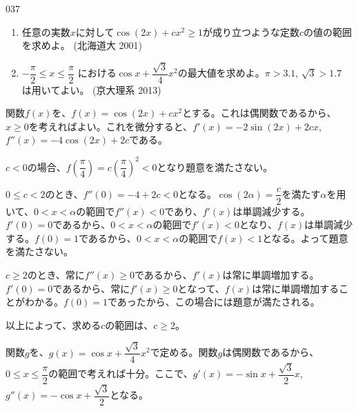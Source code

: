 \begin{prob}{037}{}{}
 \begin{enumerate}
  \item 任意の実数$x$に対して$\cos(2x)+cx^2\ge 1$が成り立つような定数$c$の値の範囲を求めよ。  (北海道大 2001)
  \item $-\dfrac{\pi}{2}\le x \le \dfrac{\pi}{2}$ における$\cos x+\dfrac{\sqrt{3}}{4}x^2$の最大値を求めよ。$\pi>3.1$, $\sqrt{3}>1.7$ は用いてよい。  (京大理系 2013)
 \end{enumerate}
\end{prob}
関数$f(x)$を、$f(x)=\cos(2x)+cx^2$とする。これは偶関数であるから、$x\ge0$を考えればよい。これを微分すると、$f'(x)=-2\sin(2x)+2cx$, $f''(x)=-4\cos(2x)+2c$である。

$c<0$の場合、$f\left(\dfrac{\pi}{4}\right)=c\left(\dfrac{\pi}{4}\right)^2<0$となり題意を満たさない。

$0\le c<2$のとき、$f''(0)=-4+2c<0$となる。$\cos(2\alpha)=\dfrac{c}{2}$を満たす$\alpha$を用いて、$0<x<\alpha$の範囲で$f''(x)<0$であり、$f'(x)$は単調減少する。$f'(0)=0$であるから、$0<x<\alpha$の範囲で$f'(x)<0$となり、$f(x)$は単調減少する。$f(0)=1$であるから、$0<x<\alpha$の範囲で$f(x)<1$となる。よって題意を満たさない。

$c\ge 2$のとき、常に$f''(x)\ge 0$であるから、$f'(x)$は常に単調増加する。$f'(0)=0$であるから、常に$f'(x)\ge 0$となって、$f(x)$は常に単調増加することがわかる。$f(0)=1$であったから、この場合には題意が満たされる。

以上によって、求める$c$の範囲は、$c\ge 2$。

関数$g$を、$g(x)=\cos x+\dfrac{\sqrt{3}}{4} x^2$で定める。関数$g$は偶関数であるから、$0\le x\le \dfrac{\pi}{2}$の範囲で考えれば十分。ここで、$g'(x)=-\sin x+\dfrac{\sqrt{3}}{2}x$, $g''(x)=-\cos x+\dfrac{\sqrt{3}}{2}$となる。

